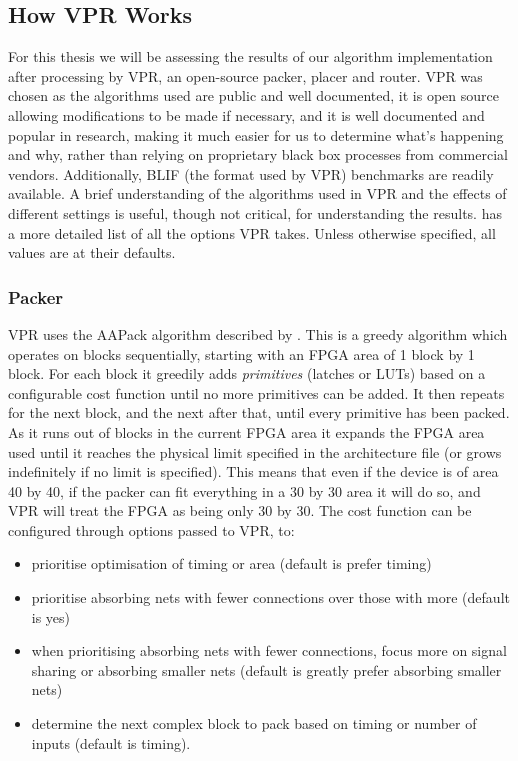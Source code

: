 \documentclass[12pt,final,oneside]{dwThesis} %
\begin{document}
   \subsection{How \gls{VPR} Works}
   \label{VPRSection} For this thesis we will be assessing the results
   of our algorithm implementation after processing by \gls{VPR}, an open-source packer, placer and router. \gls{VPR} was chosen as the algorithms
   used are public and well documented, it is open source allowing
   modifications to be made if necessary, and it is well documented and popular
   in research, making it much easier for us to determine what's happening and
   why, rather than relying on proprietary black box processes from commercial
   vendors. Additionally, \gls{BLIF} (the format used by \gls{VPR}) benchmarks
   are readily available.  A brief understanding of the algorithms used in
   \gls{VPR} and the effects of different settings is useful, though not
   critical, for understanding the results. \cite{VPRManual} has a more
   detailed list of all the options \gls{VPR} takes. Unless otherwise
   specified, all values are at their defaults.  \subsubsection{Packer}
   \gls{VPR} uses the AAPack algorithm described by \cite{AAPackThesis}. This
   is a greedy algorithm which operates on blocks sequentially, starting with
   an \gls{FPGA} area of 1 block by 1 block. For each block it greedily adds
   \textit{primitives} (latches or \glspl{LUT}) based on a configurable cost
   function until no more primitives can be added. It then repeats for the next
   block, and the next after that, until every primitive has been packed. As it
   runs out of blocks in the current \gls{FPGA} area it expands the \gls{FPGA}
   area used until it reaches the physical limit specified in the architecture
   file (or grows indefinitely if no limit is specified). This means that even
   if the device is of area 40 by 40, if the packer can fit everything in a 30
   by 30 area it will do so, and \gls{VPR} will treat the \gls{FPGA} as being
   only 30 by 30.  The cost function can be configured through options passed
   to \gls{VPR}, to\cite{VPRManual}: 
   \begin{itemize}

      \item prioritise optimisation of timing or area (default is prefer
         timing)
      \item prioritise absorbing nets with fewer connections over those with
         more (default is yes)
      \item when prioritising absorbing nets with fewer connections, focus more
         on signal sharing or absorbing smaller nets (default is greatly
         prefer absorbing smaller nets)
      \item determine the next complex block to pack based on timing or number
         of inputs (default is timing).  
   \end{itemize}
\end{document}
